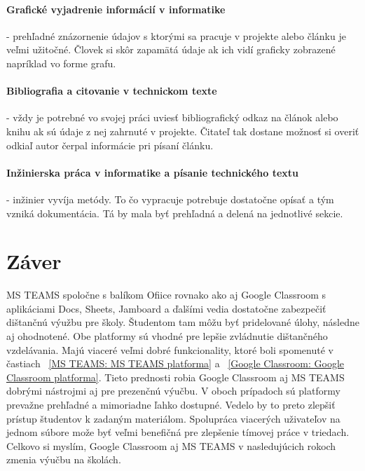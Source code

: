 \documentclass[10pt,slovak,a4paper]{article}
\begin{document}
\paragraph{Grafické vyjadrenie informácií v informatike} \label{Grafické vyjadrenie informácií v informatike} - prehľadné znázornenie údajov s ktorými sa pracuje v projekte alebo článku je veľmi užitočné. Človek si skôr zapamätá údaje ak ich vidí graficky zobrazené napríklad vo forme grafu.

\paragraph{Bibliografia a citovanie v technickom texte} \label{Bibliografia a citovanie v technickom texte} - vždy je potrebné vo svojej práci uviesť bibliografický odkaz na článok alebo knihu ak sú údaje z nej zahrnuté v projekte. Čitateľ tak dostane možnosť si overiť odkiaľ autor čerpal informácie pri písaní článku.

\paragraph{Inžinierska práca v informatike a písanie technického textu}\label{Inžinierska práca v informatike a písanie technického textu} - inžinier vyvíja metódy. To čo vypracuje potrebuje dostatočne opísať a tým vzniká dokumentácia. Tá by mala byť prehľadná a delená na jednotlivé sekcie.


\section{Záver} \label{zaver} 
MS TEAMS spoločne s balíkom Ofiice rovnako ako aj Google Classroom s aplikáciami Docs, Sheets, Jamboard a ďalšími vedia dostatočne zabezpečiť dištančnú výužbu pre školy. Študentom tam môžu byť pridelované úlohy, následne aj ohodnotené. Obe platformy sú vhodné pre lepšie zvládnutie dištančného vzdelávania. Majú viaceré veľmi dobré funkcionality, ktoré boli spomenuté v častiach ~\ref{MS TEAMS: MS TEAMS platforma} a ~\ref {Google Classroom: Google Classroom platforma}. Tieto prednosti robia Google Classroom aj MS TEAMS dobrými nástrojmi aj pre prezenčnú výučbu. V oboch prípadoch sú platformy prevažne prehľadné a mimoriadne ľahko dostupné. Vedelo by to preto zlepšiť prístup študentov k zadaným materiálom. Spolupráca viacerých uživateľov na jednom súbore može byť veľmi benefičná pre zlepšenie tímovej práce v triedach. Celkovo si myslím, Google Classroom aj MS TEAMS v nasledujúcich rokoch zmenia výučbu na školách.
\end{document}
